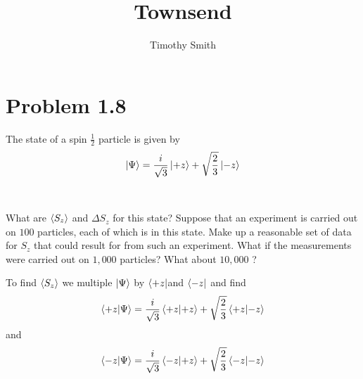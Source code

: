 \documentclass{article}
\begin{document}
\author{Timothy Smith}
\title{Townsend}
\maketitle

\section*{Problem 1.8}
The state of a spin $ \frac{1}{2}$  particle  is given by 
$$ \ket{\Psi}=\frac{i}{\sqrt{3}} \ket{+z}+\sqrt{\frac{2}{3}} \ket{-z} $$
\\
\\
What are $\expval{S_z} $ and $\Delta S_z $ for this state? Suppose  that an experiment is carried out on $100$ particles, each of which is in this state. Make up a reasonable set of data for $S_z$ that could result for from such an experiment. What if the measurements were carried out on $1,000$  particles? What about $10,000$ ?

To find $\expval{S_z}$ we multiple $\ket{\Psi}$ by $\bra{+z} $and $\bra{-z} $ and find
\\
$$\braket{+z}{\Psi}=\frac{i}{\sqrt{3}} \braket{+z}{+z}+\sqrt{\frac{2}{3}}  \braket{+z}{-z} $$
and
$$\braket{-z}{\Psi}=\frac{i}{\sqrt{3}} \braket{-z}{+z}+\sqrt{\frac{2}{3}}  \braket{-z}{-z} $$
\end{document}
